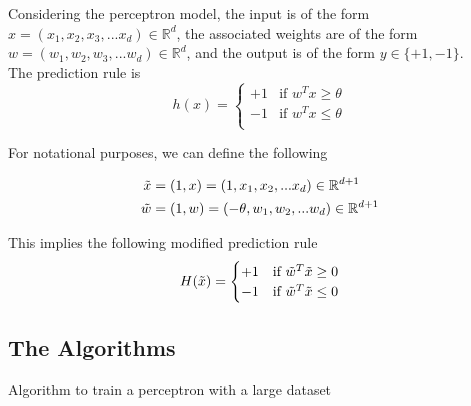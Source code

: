 \documentclass{report}
\begin{document}
\noindent Considering the perceptron model, the input is of the form $x = (x_1,x_2,x_3,...x_d) \in \mathbb{R}^d$, the associated weights are of the form $w = (w_1,w_2,w_3,...w_d) \in \mathbb{R}^d$, and the output is of the form $y \in \{+1,-1\}$. \\

\noindent The prediction rule is
$$
  h(x) =
  \begin{cases}
    +1 & \text{if } w^Tx \geq \theta \\
    -1 & \text{if } w^Tx \le \theta  \\
  \end{cases}
$$

\noindent For notational purposes, we can define the following

\begin{align*}
  \Tilde{x} & = (1,x) = (1,x_1,x_2,...x_d) \in \mathbb{R}^{d+1}       \\
  \Tilde{w} & = (1,w) = (-\theta,w_1,w_2,...w_d) \in \mathbb{R}^{d+1}
\end{align*}

\noindent This implies the following modified prediction rule
$$
  H(\Tilde{x}) =
  \begin{cases}
    +1 & \text{if } \Tilde{w}^T\Tilde{x} \geq 0 \\
    -1 & \text{if } \Tilde{w}^T\Tilde{x} \le 0  \\
  \end{cases}
$$

\subsection{The Algorithms}

\begin{algorithm}
  \caption{Algorithm to train a perceptron with a large dataset}
\end{algorithm}
\end{document}
